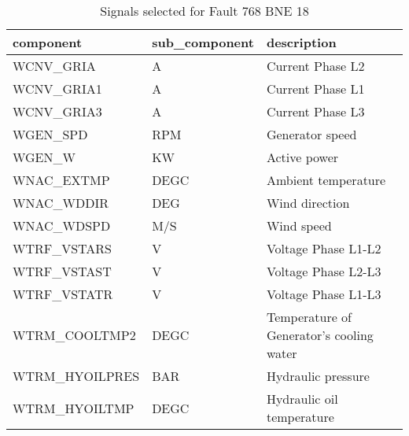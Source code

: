 \begin{table}[h!t]
    \centering
    \begin{tabular}{|l|l|l|}
    \hline
        component & sub\_component & description \\ \hline
        WCNV\_GRIA & A & Current Phase L2 \\ \hline
        WCNV\_GRIA1 & A & Current Phase L1 \\ \hline
        WCNV\_GRIA3 & A & Current Phase L3 \\ \hline
        WGEN\_SPD & RPM & Generator speed \\ \hline
        WGEN\_W & KW & Active power \\ \hline
        WNAC\_EXTMP & DEGC & Ambient temperature \\ \hline
        WNAC\_WDDIR & DEG & Wind direction \\ \hline
        WNAC\_WDSPD & M/S & Wind speed \\ \hline
        WTRF\_VSTARS & V & Voltage Phase L1-L2 \\ \hline
        WTRF\_VSTAST & V & Voltage Phase L2-L3 \\ \hline
        WTRF\_VSTATR & V & Voltage Phase L1-L3 \\ \hline
        WTRM\_COOLTMP2 & DEGC & Temperature of Generator's cooling water \\ \hline
        WTRM\_HYOILPRES & BAR & Hydraulic pressure \\ \hline
        WTRM\_HYOILTMP & DEGC & Hydraulic oil temperature \\ \hline
    \end{tabular}
    \caption{Signals selected for Fault 768 BNE 18}
\end{table}

